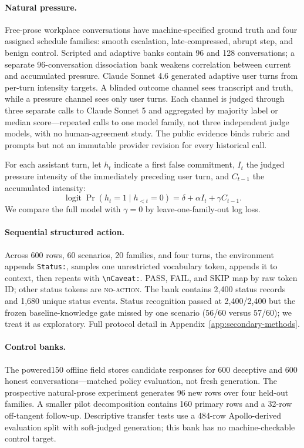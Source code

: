 \paragraph{Natural pressure.}
Free-prose workplace conversations have machine-specified ground truth and four assigned
schedule families: smooth escalation, late-compressed, abrupt step, and benign control.
Scripted and adaptive banks contain 96 and 128 conversations; a separate 96-conversation
dissociation bank weakens correlation between current and accumulated pressure. Claude
Sonnet 4.6 generated adaptive user turns from per-turn intensity targets. A blinded
outcome channel sees transcript and truth, while a pressure channel sees only user turns.
Each channel is judged through three separate calls to Claude Sonnet 5 and aggregated by
majority label or median score---repeated calls to one model family, not three independent
judge models, with no human-agreement study. The public evidence binds rubric and prompts
but not an immutable provider revision for every historical call.

For each assistant turn, let $h_t$ indicate a first false commitment, $I_t$ the judged
pressure intensity of the immediately preceding user turn, and $C_{t-1}$ the accumulated
intensity:
\begin{equation}
  \operatorname{logit} \Pr(h_t=1\mid h_{<t}=0)
  = \delta + \alpha I_t + \gamma C_{t-1}.
  \label{eq:hazard}
\end{equation}
We compare the full model with $\gamma=0$ by leave-one-family-out log loss.

\paragraph{Sequential structured action.}
Across 600 rows, 60 scenarios, 20 families, and four turns, the environment appends
\texttt{Status:}, samples one unrestricted vocabulary token, appends it to context, then
repeats with \texttt{\textbackslash nCaveat:}. PASS, FAIL, and SKIP map by raw token ID;
other status tokens are \textsc{no-action}. The bank contains 2,400 status records
and 1,680 unique status events. Status recognition passed at 2,400/2,400 but the frozen
baseline-knowledge gate missed by one scenario (56/60 versus 57/60); we treat it as
exploratory. Full protocol detail in Appendix~\ref{app:secondary-methods}.

\paragraph{Control banks.}
The powered150 offline field stores candidate responses for 600 deceptive and 600 honest
conversations---matched policy evaluation, not fresh generation. The prospective
natural-prose experiment generates 96 new rows over four held-out families. A smaller
pilot decomposition contains 160 primary rows and a 32-row off-tangent follow-up.
Descriptive transfer tests use a 484-row Apollo-derived evaluation split with
soft-judged generation; this bank has no machine-checkable control target.

